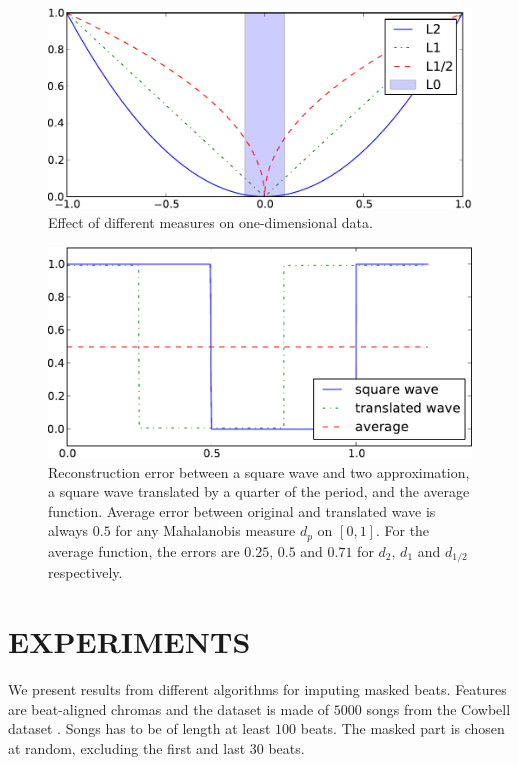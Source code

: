 \documentclass{article}
\begin{document}
\begin{figure}[t]
\begin{center}
\includegraphics[width=.85\columnwidth]{measures}
\end{center}
\caption{Effect of different measures on one-dimensional data.
\label{fig:measures}}
\end{figure}

\begin{figure}[t]
\begin{center}
\includegraphics[width=.8\columnwidth]{square}
\end{center}
\caption{Reconstruction error between a square wave and two approximation,
a square wave translated by a quarter of the period, and the average
function. Average error between original and translated wave is always $0.5$
for any Mahalanobis measure $d_p$ on $[0,1]$. 
For the average function, the errors are
$0.25$, $0.5$ and $0.71$ for $d_2$, $d_1$ and $d_{1/2}$ respectively.
\label{fig:square}}
\end{figure}

\section{EXPERIMENTS}
\label{sec:exp}
We present results from different algorithms for imputing masked
beats.  Features are beat-aligned chromas and the dataset is made of
$5000$ songs from the Cowbell dataset
\cite{Bertin-Mahieux2010a}. Songs has to be of length at least $100$
beats.  The masked part is chosen at random, excluding the first and
last $30$ beats.
\end{document}

